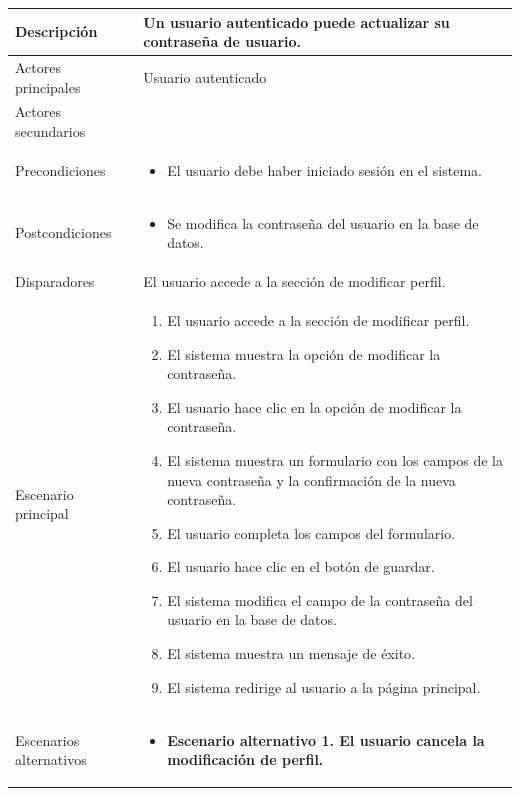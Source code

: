 \begin{longtable}{
    >{\columncolor{lightgreen!20}}p{4cm}
    p{12cm}
    }
    \midrule
    Descripción & Un usuario autenticado puede actualizar su contraseña de usuario. \\
    \midrule
    Actores principales & Usuario autenticado \\
    \midrule
    Actores secundarios &  \\
    \midrule
    Precondiciones & \begin{itemize}[nosep,leftmargin=*]
        \item El usuario debe haber iniciado sesión en el sistema.
    \end{itemize} \\
    \midrule
    Postcondiciones & \begin{itemize}[nosep,leftmargin=*]
        \item Se modifica la contraseña del usuario en la base de datos.
    \end{itemize} \\
    \midrule
    Disparadores & El usuario accede a la sección de modificar perfil. \\
    \midrule
    Escenario principal & \begin{enumerate}[nosep,leftmargin=*]
        \item El usuario accede a la sección de modificar perfil.
        \item El sistema muestra la opción de modificar la contraseña.
        \item El usuario hace clic en la opción de modificar la contraseña.
        \item El sistema muestra un formulario con los campos de la nueva contraseña y la confirmación de la nueva contraseña.
        \item El usuario completa los campos del formulario.
        \item El usuario hace clic en el botón de guardar.
        \item El sistema modifica el campo de la contraseña del usuario en la base de datos.
        \item El sistema muestra un mensaje de éxito.
        \item El sistema redirige al usuario a la página principal.
    \end{enumerate} \\
    \midrule
    Escenarios alternativos & 
    \begin{itemize}[nosep,leftmargin=*]
        \item \textbf{Escenario alternativo 1. El usuario cancela la modificación de perfil.}

\end{itemize}
\end{longtable}

